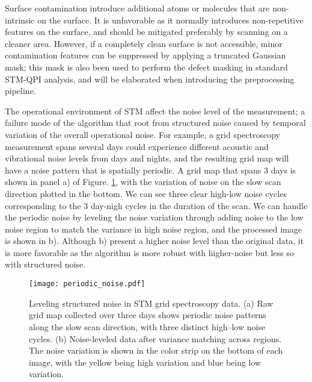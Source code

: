 Surface contamination introduce additional atoms or molecules that are non-intrinsic on the surface. It is unfavorable as it normally introduces non-repetitive features on the surface, and should be mitigated preferably by scanning on a cleaner area. However, if a completely clean surface is not accessible, minor contamination features can be suppressed by applying a truncated Gaussian mask; this mask is also been used to perform the defect masking in standard STM-QPI analysis, and will be elaborated when introducing the preprocessing pipeline.

The operational environment of STM affect the noise level of the measurement; a failure mode of the algorithm that root from structured noise caused by temporal variation of the overall operational noise. For example, a grid spectroscopy measurement spans several days could experience different acoustic and vibrational noise levels from days and nights, and the resulting grid map will have a noise pattern that is spatially periodic. A grid map that spans 3 days is shown in panel a) of Figure. \ref{fig:periodic_noise}, with the variation of noise on the slow scan direction plotted in the bottom. We can see three clear high-low noise cycles corresponding to the 3 day-nigh cycles in the duration of the scan. We can handle the periodic noise by leveling the noise variation through adding noise to the low noise region to match the variance in high noise region, and the processed image is shown in b). Although b) present a higher noise level than the original data, it is more favorable as the algorithm is more robust with higher-noise but less so with structured noise.   

\begin{figure}
	\texttt{[image: periodic\_noise.pdf]} 
	\centering
	\caption{Leveling structured noise in STM grid spectroscopy data. (a) Raw grid map collected over three days shows periodic noise patterns along the slow scan direction, with three distinct high–low noise cycles. (b) Noise-leveled data after variance matching across regions. The noise variation is shown in the color strip on the bottom of each image, with the yellow being high variation and blue being low variation.}
	\label{fig:periodic_noise}
\end{figure}

